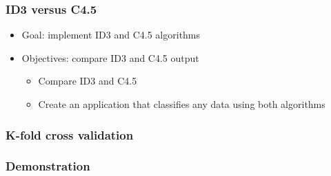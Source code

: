 \documentclass{beamer}
\begin{document}
\begin{frame}
\frametitle{ID3 versus C4.5}
	\begin{itemize}
		\item Goal: implement ID3 and C4.5 algorithms
		\vfill
		\item Objectives: compare ID3 and C4.5 output
		\vfill
		\begin{itemize}
			\item Compare ID3 and C4.5
			\vfill
			\item Create an application that classifies any data using both algorithms
		\end{itemize}

	\end{itemize}

\end{frame}





\begin{frame}
\frametitle{K-fold cross validation}

\end{frame}

\begin{frame}
\frametitle{Demonstration}

\end{frame}
\end{document}
